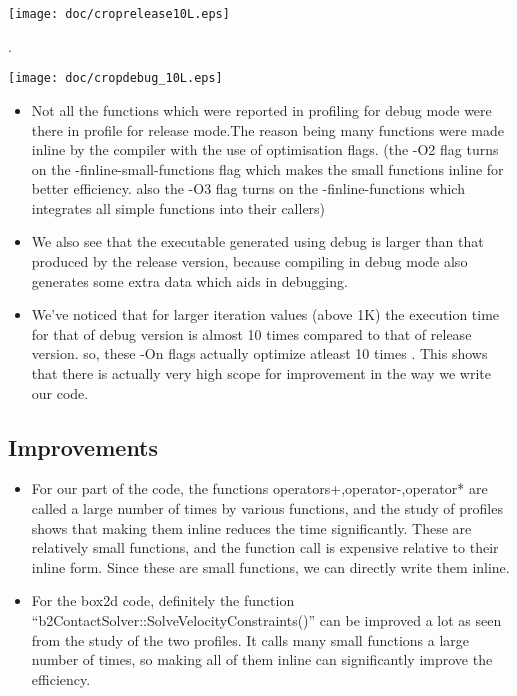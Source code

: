 \documentclass[11pt,english]{article}
\begin{document}
\texttt{[image: doc/croprelease10L.eps]}

.

\texttt{[image: doc/cropdebug\_10L.eps]}

\begin{itemize}
\item Not all the functions which were reported in profiling for debug mode
were there in profile for release mode.The reason being many functions
were made inline by the compiler with the use of optimisation flags. (the -O2 flag turns on the -finline-small-functions flag which makes
the small functions inline for better efficiency. also the -O3 flag
turns on the -finline-functions which integrates all simple functions
into their callers)


\item We also see that the executable generated using debug is larger than
that produced by the release version, because compiling in debug mode
also generates some extra data which aids in debugging.

\item We've noticed that for larger iteration values (above 1K) the execution
time for that of debug version is almost 10 times compared to that
of release version. so, these -On flags actually optimize atleast
10 times . This shows that there is actually very high scope for improvement
in the way we write our code.
\end{itemize}

\subsection{Improvements}
\begin{itemize}
\item For our part of the code, the functions operators+,operator-,operator{*}
are called a large number of times by various functions, and the study
of profiles shows that making them inline reduces the time significantly.
These are relatively small functions, and the function call is expensive relative
to their inline form. Since these are small functions, we can directly write
them inline.
\item For the box2d code, definitely the function ``b2ContactSolver::SolveVelocityConstraints()''
can be improved a lot as seen from the study of the two profiles.
It calls many small functions a large number of times, so making all
of them inline can significantly improve the efficiency.
\end{itemize}
\end{document}
